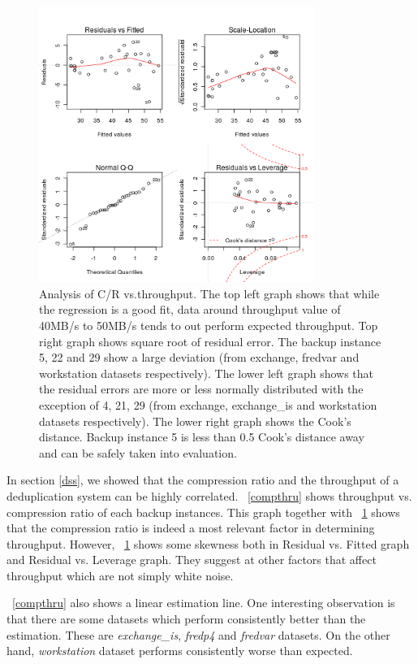 \begin{figure}[!t]
\centering
\includegraphics[width=0.8\textwidth]{figure/dedup/full019}
\captionsetup{format=myformat}
\caption{Analysis of C/R vs.throughput. The top left graph shows that while the regression is a good fit, data around throughput value of 40MB/s to 50MB/s tends to out perform expected throughput. Top right graph shows square root of residual error. The backup instance 5, 22 and 29 show a large deviation (from exchange, fredvar and workstation datasets respectively). The lower left graph shows that the residual errors are more or less normally distributed with the exception of 4, 21, 29 (from exchange, exchange\_is and workstation datasets respectively). The lower right graph shows the Cook's distance. Backup instance 5 is less than 0.5 Cook's distance away and can be safely taken into evaluation.} 
\label{anal}
\end{figure}

In section \ref{dss}, we showed that the compression ratio and the throughput of a deduplication system can be highly correlated. \figurename~\ref{compthru} shows throughput vs. compression ratio of each backup instances. This graph together with \figurename~\ref{anal} shows that the compression ratio is indeed a most relevant factor in determining throughput. However, \figurename~\ref{anal} shows some skewness both in Residual vs. Fitted graph and Residual vs. Leverage graph. They suggest at other factors that affect throughput which are not simply white noise. 

\figurename~\ref{compthru} also shows a linear estimation line. One interesting observation is that there are some datasets which perform consistently better than the estimation. These are \emph{exchange\_is}, \emph{fredp4} and \emph{fredvar} datasets. On the other hand, \emph{workstation} dataset performs consistently worse than expected. 

